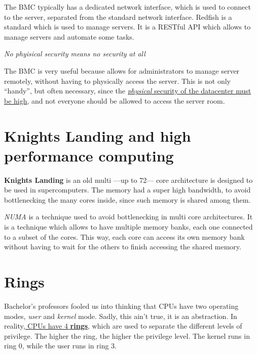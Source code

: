 The BMC typically has a dedicated network interface, which is used to connect to the server, separated from the standard network interface.
Redfish is a standard which is used to manage servers. It is a RESTful API which allows to manage servers and automate some tasks.


\begin{center}
   \textit{No phyisical security means no security at all}
\end{center}
The BMC is very useful because allows for administrators to manage server remotely, without having to physically access the server.
This is not only ``handy'', but often necessary, since the \ul{\textit{physical} security of the datacenter must be high}, and not everyone should be allowed to access the server room.


\section{Knights Landing and high performance computing}
\textbf{Knights Landing} is an old multi ---up to 72--- core architecture is designed to be used in supercomputers. The memory had a super high bandwidth, to avoid bottlenecking the many cores inside, since such memory is shared among them.

\textit{NUMA} is a technique used to avoid bottlenecking in multi core architectures. It is a technique which allows to have multiple memory banks, each one connected to a subset of the cores. This way, each core can access its own memory bank without having to wait for the others to finish accessing the shared memory.



\section{Rings}
Bachelor's professors fooled us into thinking that CPUs have two operating modes, \textit{user} and \textit{kernel} mode. Sadly, this ain't true, it is an abstraction. In reality,\ul{ CPUs have 4 \textbf{rings}}, which are used to separate the different levels of privilege. The higher the ring, the higher the privilege level.
The kernel runs in ring 0, while the user runs in ring 3.

